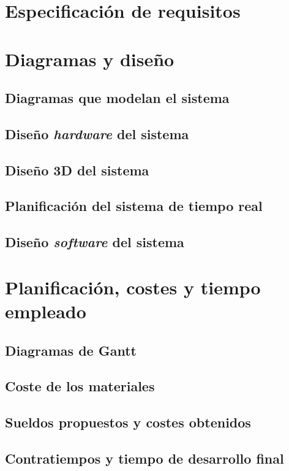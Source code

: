 \chapter{Especificación de requisitos}\label{chap:requirements}


\chapter{Diagramas y diseño}\label{chap:design}

\section{Diagramas que modelan el sistema}\label{sec:sys-diagrams}
\section{Diseño \textit{hardware} del sistema}\label{sec:hardware-design}
\section{Diseño 3D del sistema}\label{sec:3d-design}
\section{Planificación del sistema de tiempo real}\label{sec:rt-design}
\section{Diseño \textit{software} del sistema}\label{sec:software-design}

\chapter{Planificación, costes y tiempo empleado}\label{chap:planification}
\section{Diagramas de Gantt}
\section{Coste de los materiales}
\section{Sueldos propuestos y costes obtenidos}
\section{Contratiempos y tiempo de desarrollo final}

